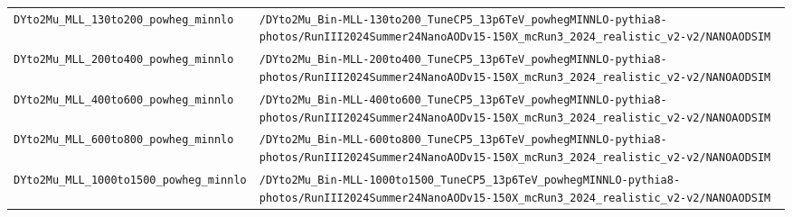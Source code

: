 \begin{longtable}{@{}>{\RaggedRight\arraybackslash}p{} >{\RaggedRight\arraybackslash}p{}@{}}
\addlinespace[2pt]
\texttt{DYto2Mu\_\allowbreak{}MLL\_\allowbreak{}130to200\_\allowbreak{}powheg\_\allowbreak{}minnlo} & \texttt{/\allowbreak{}DYto2Mu\_\allowbreak{}Bin-\allowbreak{}MLL-\allowbreak{}130to200\_\allowbreak{}TuneCP5\_\allowbreak{}13p6TeV\_\allowbreak{}powhegMINNLO-\allowbreak{}pythia8-\allowbreak{}photos/\allowbreak{}RunIII2024Summer24NanoAODv15-\allowbreak{}150X\_\allowbreak{}mcRun3\_\allowbreak{}2024\_\allowbreak{}realistic\_\allowbreak{}v2-\allowbreak{}v2/\allowbreak{}NANOAODSIM} \\
\addlinespace[2pt]
\texttt{DYto2Mu\_\allowbreak{}MLL\_\allowbreak{}200to400\_\allowbreak{}powheg\_\allowbreak{}minnlo} & \texttt{/\allowbreak{}DYto2Mu\_\allowbreak{}Bin-\allowbreak{}MLL-\allowbreak{}200to400\_\allowbreak{}TuneCP5\_\allowbreak{}13p6TeV\_\allowbreak{}powhegMINNLO-\allowbreak{}pythia8-\allowbreak{}photos/\allowbreak{}RunIII2024Summer24NanoAODv15-\allowbreak{}150X\_\allowbreak{}mcRun3\_\allowbreak{}2024\_\allowbreak{}realistic\_\allowbreak{}v2-\allowbreak{}v2/\allowbreak{}NANOAODSIM} \\
\addlinespace[2pt]
\texttt{DYto2Mu\_\allowbreak{}MLL\_\allowbreak{}400to600\_\allowbreak{}powheg\_\allowbreak{}minnlo} & \texttt{/\allowbreak{}DYto2Mu\_\allowbreak{}Bin-\allowbreak{}MLL-\allowbreak{}400to600\_\allowbreak{}TuneCP5\_\allowbreak{}13p6TeV\_\allowbreak{}powhegMINNLO-\allowbreak{}pythia8-\allowbreak{}photos/\allowbreak{}RunIII2024Summer24NanoAODv15-\allowbreak{}150X\_\allowbreak{}mcRun3\_\allowbreak{}2024\_\allowbreak{}realistic\_\allowbreak{}v2-\allowbreak{}v2/\allowbreak{}NANOAODSIM} \\
\addlinespace[2pt]
\texttt{DYto2Mu\_\allowbreak{}MLL\_\allowbreak{}600to800\_\allowbreak{}powheg\_\allowbreak{}minnlo} & \texttt{/\allowbreak{}DYto2Mu\_\allowbreak{}Bin-\allowbreak{}MLL-\allowbreak{}600to800\_\allowbreak{}TuneCP5\_\allowbreak{}13p6TeV\_\allowbreak{}powhegMINNLO-\allowbreak{}pythia8-\allowbreak{}photos/\allowbreak{}RunIII2024Summer24NanoAODv15-\allowbreak{}150X\_\allowbreak{}mcRun3\_\allowbreak{}2024\_\allowbreak{}realistic\_\allowbreak{}v2-\allowbreak{}v2/\allowbreak{}NANOAODSIM} \\
\addlinespace[2pt]
\texttt{DYto2Mu\_\allowbreak{}MLL\_\allowbreak{}1000to1500\_\allowbreak{}powheg\_\allowbreak{}minnlo} & \texttt{/\allowbreak{}DYto2Mu\_\allowbreak{}Bin-\allowbreak{}MLL-\allowbreak{}1000to1500\_\allowbreak{}TuneCP5\_\allowbreak{}13p6TeV\_\allowbreak{}powhegMINNLO-\allowbreak{}pythia8-\allowbreak{}photos/\allowbreak{}RunIII2024Summer24NanoAODv15-\allowbreak{}150X\_\allowbreak{}mcRun3\_\allowbreak{}2024\_\allowbreak{}realistic\_\allowbreak{}v2-\allowbreak{}v2/\allowbreak{}NANOAODSIM} \\

\end{longtable}
